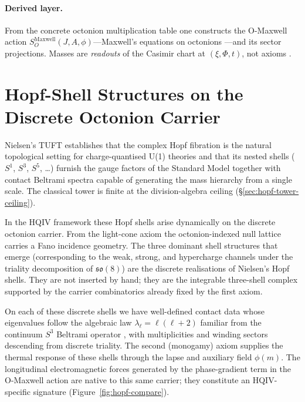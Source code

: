 \documentclass[11pt]{amsart}
\begin{document}
\paragraph{Derived layer.}
From the concrete octonion multiplication table \cite{baez2002octonions,Dixon1994,Gunaydin1974} one constructs the O-Maxwell action $S_O^{\mathrm{Maxwell}}(J,A,\phi)$---Maxwell's equations on octonions \cite{maxwell1865,jackson1999}---and its sector projections. Masses are \emph{readouts} of the Casimir chart at $(\xi,\Phi,t)$, not axioms \cite{casimir1948}.

\section{Hopf-Shell Structures on the Discrete Octonion Carrier}

Nielsen's TUFT establishes that the complex Hopf fibration \cite{hopf1931,Husemoller1994,Milnor1956,steenrod1951} is the natural topological setting for charge-quantised U(1) theories and that its nested shells ($S^1$, $S^3$, $S^5$, \ldots) furnish the gauge factors of the Standard Model together with contact Beltrami spectra \cite{beltrami1892,Geiges2008} capable of generating the mass hierarchy from a single scale. The classical tower is finite at the division-algebra ceiling (§\ref{sec:hopf-tower-ceiling}).

In the HQIV framework these Hopf shells arise dynamically on the discrete octonion carrier. From the light-cone axiom the octonion-indexed null lattice carries a Fano incidence geometry. The three dominant shell structures that emerge (corresponding to the weak, strong, and hypercharge channels under the triality decomposition of $\mathfrak{so}(8)$) are the discrete realisations of Nielsen's Hopf shells. They are not inserted by hand; they are the integrable three-shell complex supported by the carrier combinatorics already fixed by the first axiom.

On each of these discrete shells we have well-defined contact data whose eigenvalues follow the algebraic law $\lambda_\ell = \ell(\ell+2)$ familiar from the continuum $S^3$ Beltrami operator \cite{beltrami1892,RaySinger1971}, with multiplicities and winding sectors descending from discrete triality. The second (monogamy) axiom supplies the thermal response of these shells through the lapse and auxiliary field $\phi(m)$. The longitudinal electromagnetic forces generated by the phase-gradient term in the O-Maxwell action are native to this same carrier; they constitute an HQIV-specific signature (Figure~\ref{fig:hopf-compare}).
\end{document}
